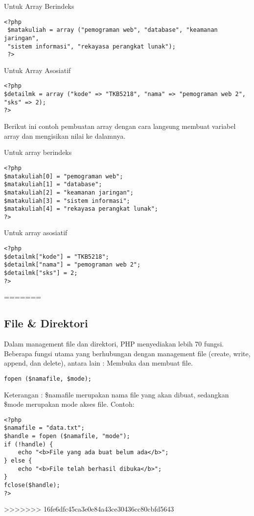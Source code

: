 \item{Untuk Array Berindeks}
\begin{lstlisting}
<?php
 $matakuliah = array ("pemograman web", "database", "keamanan jaringan",
 "sistem informasi", "rekayasa perangkat lunak");
 ?>
\end{lstlisting}

\item{Untuk Array Asosiatif}
\begin{lstlisting}
<?php
$detailmk = array ("kode" => "TKB5218", "nama" => "pemograman web 2", "sks" => 2);
?>
\end{lstlisting}

Berikut ini contoh pembuatan array dengan cara langsung membuat variabel array dan mengisikan nilai ke dalamnya.

\item{Untuk array berindeks}
\begin{lstlisting}
<?php 
$matakuliah[0] = "pemograman web"; 
$matakuliah[1] = "database"; 
$matakuliah[2] = "keamanan jaringan"; 
$matakuliah[3] = "sistem informasi"; 
$matakuliah[4] = "rekayasa perangkat lunak"; 
?>
\end{lstlisting}

\item{Untuk array asosiatif}
\begin{lstlisting}
<?php 
$detailmk["kode"] = "TKB5218"; 
$detailmk["nama"] = "pemograman web 2"; 
$detailmk["sks"] = 2; 
?>
\end{lstlisting}
=======
\subsection{File & Direktori}
Dalam management file dan direktori, PHP menyediakan lebih 70 fungsi. Beberapa fungsi utama yang berhubungan dengan management file (create, write, append, dan delete), antara lain : Membuka dan membuat file.
\begin{lstlisting}
fopen ($namafile, $mode);
\end{lstlisting}
Keterangan :
\$namafile merupakan nama file yang akan dibuat, sedangkan \$mode merupakan mode akses file. Contoh:
\begin{lstlisting}
<?php
$namafile = "data.txt";
$handle = fopen ($namafile, "mode");
if (!handle) {
	echo "<b>File yang ada buat belum ada</b>";
} else {
	echo "<b>File telah berhasil dibuka</b>";
}
fclose($handle);
?>
\end{lstlisting}


>>>>>>> 16fe6dfc45ca3e0e84a43ce30436cc80cbfd5643
